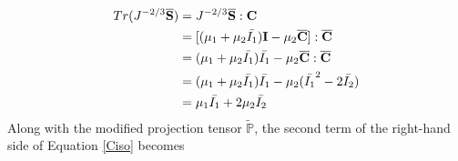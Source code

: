\begin{equation}
\begin{split}
Tr(J^{-2/3}\overline{\bold{S}}) &= J^{-2/3}{\overline{\bold{S}}} : {\bold{C}} \\
&= [(\mu_1 + \mu_2{\bar{I_1}})\bold{I} - \mu_2{\overline{\bold{C}}}] : \overline{\bold{C}} \\
&= (\mu_1 + \mu_2\bar{I_1})\bar{I_1} - \mu_2{\overline{\bold{C}}} : {\overline{\bold{C}}} \\
&= (\mu_1 + \mu_2\bar{I_1})\bar{I_1} - \mu_2({\bar{I_1}}^2 - 2\bar{I_2}) \\
&= \mu_1\bar{I_1} + 2\mu_2\bar{I_2}
\end{split}
\end{equation}
Along with the modified projection tensor $\tilde{\mathbb{P}}$, the second term of the right-hand side of Equation \ref{Ciso} becomes

